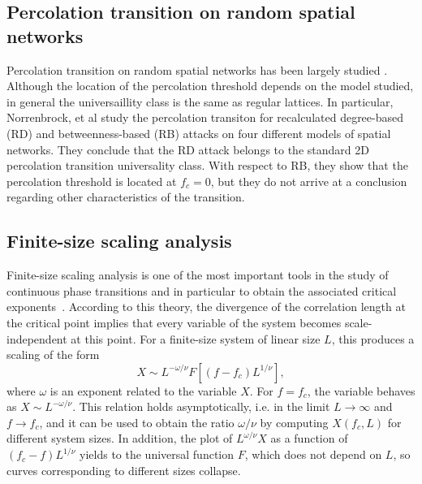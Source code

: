 \documentclass{article}
\begin{document}
\subsection{Percolation transition on random spatial networks}

Percolation transition on random spatial networks has been largely studied \cite{Melchert2013,Becker2009,Norrenbrock2016a}. Although the location of the percolation threshold depends on the model studied, in general the universaillity class is the same as regular lattices. In particular, Norrenbrock, et al \cite{Norrenbrock2016FragmentationAttacks} study the percolation transiton for recalculated degree-based (RD) and betweenness-based (RB) attacks on four different models of spatial networks. They conclude that the RD attack belongs to the standard 2D percolation transition universality class. With respect to RB, they show that the percolation threshold is located at $f_c = 0$, but they do not arrive at a conclusion regarding other characteristics of the transition.


\subsection{Finite-size scaling analysis}


Finite-size scaling analysis is one of the most important tools in the study of  continuous phase transitions and in particular to obtain the associated critical exponents~\cite{Cho2010Finite-sizeTransitions, Fortunato2011ExplosiveGraphs, Zhu2017FiniteTransition}.
According to this theory, the divergence of the correlation length at the critical point implies that every variable of the system becomes scale-independent at this point. For a finite-size system of linear size $L$, this produces a scaling of the form
%
\begin{equation}
    X \sim L^{-\omega/\nu} F[(f-f_c) L^{1/\nu}],
\end{equation}
%
where $\omega$ is an exponent related to the variable $X$. For $f=f_c$, the variable behaves as $X \sim L^{-\omega/\nu}$. This relation holds asymptotically, i.e. in the limit $L \rightarrow \infty$ and $f \rightarrow f_c$, and it can be used to obtain the ratio $\omega/\nu$ by computing $X(f_c, L)$ for different system sizes. In addition, the plot of $L^{\omega/\nu}X$ as a function of $(f_c-f) L^{1/\nu}$ yields to the universal function $F$, which does not depend on $L$, so curves corresponding to different sizes collapse. 
\end{document}
